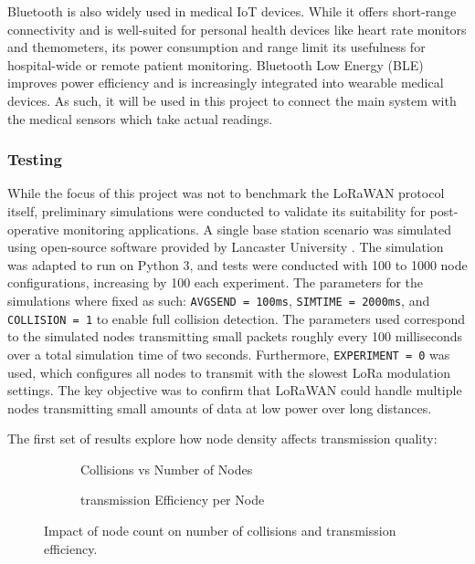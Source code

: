 Bluetooth is also widely used in medical IoT devices. While it offers short-range connectivity and is well-suited for personal health devices like heart rate monitors and themometers, its power consumption and range limit its usefulness for hospital-wide or remote patient monitoring. Bluetooth Low Energy (BLE) improves power efficiency and is increasingly integrated into wearable medical devices. As such, it will be used in this project to connect the main system with the medical sensors which take actual readings.

\subsubsection{Testing}
While the focus of this project was not to benchmark the LoRaWAN protocol itself, preliminary simulations were conducted to validate its suitability for post-operative monitoring applications. A single base station scenario was simulated using open-source software provided by Lancaster University \cite{lancaster_uk_simulation_software}. The simulation was adapted to run on Python 3, and tests were conducted with 100 to 1000 node configurations, increasing by 100 each experiment. The parameters for the simulations where fixed as such: \texttt{AVGSEND = 100ms}, \texttt{SIMTIME = 2000ms}, and \texttt{COLLISION = 1} to enable full collision detection. The parameters used correspond to the simulated nodes transmitting small packets roughly every 100 milliseconds over a total simulation time of two seconds. Furthermore, \texttt{EXPERIMENT = 0} was used, which configures all nodes to transmit with the slowest LoRa modulation settings. The key objective was to confirm that LoRaWAN could handle multiple nodes transmitting small amounts of data at low power over long distances.

\vspace{1em} \noindent The first set of results explore how node density affects transmission quality:
\begin{figure}[H]
\centering
\begin{subfigure}{0.48\textwidth}
	\centering
	
	\caption{Collisions vs Number of Nodes}
	\label{fig:collisions_vs_nodes}
\end{subfigure}
\hfill
\begin{subfigure}{0.48\textwidth}
	\centering
	
	\caption{transmission Efficiency per Node}
	\label{fig:efficiency_vs_nodes}
\end{subfigure}
\caption{Impact of node count on number of collisions and transmission efficiency.}
\end{figure}

